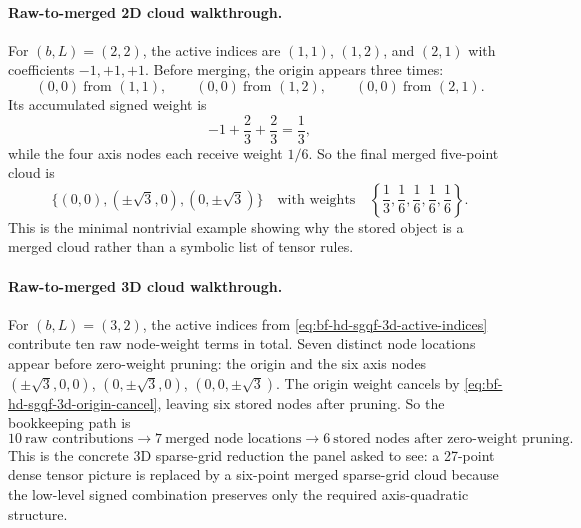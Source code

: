 \paragraph{Raw-to-merged 2D cloud walkthrough.}
For \((b,L)=(2,2)\), the active indices are \((1,1)\), \((1,2)\), and
\((2,1)\) with coefficients \(-1,+1,+1\).  Before merging, the origin appears
three times:
\begin{equation}
  (0,0)\ \text{from }(1,1),
  \qquad
  (0,0)\ \text{from }(1,2),
  \qquad
  (0,0)\ \text{from }(2,1).
  \label{eq:bf-hd-sgqf-2d-origin-repeat}
\end{equation}
Its accumulated signed weight is
\begin{equation}
  -1+\frac23+\frac23=\frac13,
  \label{eq:bf-hd-sgqf-2d-origin-accum}
\end{equation}
while the four axis nodes each receive weight \(1/6\).  So the final merged
five-point cloud is
\begin{equation}
  \{(0,0),(\pm\sqrt3,0),(0,\pm\sqrt3)\}
  \quad\text{with weights}\quad
  \left\{\frac13,\frac16,\frac16,\frac16,\frac16\right\}.
  \label{eq:bf-hd-sgqf-2d-merged-cloud}
\end{equation}
This is the minimal nontrivial example showing why the stored object is a merged
cloud rather than a symbolic list of tensor rules.

\paragraph{Raw-to-merged 3D cloud walkthrough.}
For \((b,L)=(3,2)\), the active indices from
\eqref{eq:bf-hd-sgqf-3d-active-indices} contribute ten raw node-weight terms in
total.  Seven distinct node locations appear before zero-weight pruning: the
origin and the six axis nodes \((\pm\sqrt3,0,0)\), \((0,\pm\sqrt3,0)\),
\((0,0,\pm\sqrt3)\).  The origin weight cancels by
\eqref{eq:bf-hd-sgqf-3d-origin-cancel}, leaving six stored nodes after pruning.
So the bookkeeping path is
\begin{equation}
  10\ \text{raw contributions}
  \longrightarrow
  7\ \text{merged node locations}
  \longrightarrow
  6\ \text{stored nodes after zero-weight pruning}.
  \label{eq:bf-hd-sgqf-3d-merge-counts}
\end{equation}
This is the concrete 3D sparse-grid reduction the panel asked to see: a 27-point
dense tensor picture is replaced by a six-point merged sparse-grid cloud because
the low-level signed combination preserves only the required axis-quadratic
structure.

